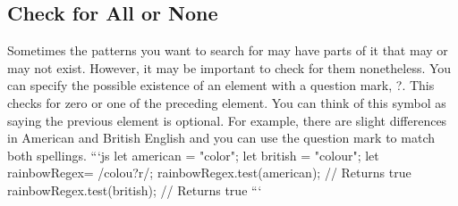 \documentclass{article}%
\begin{document}
%
\subsection{Check for All or None}%
\label{subsec:CheckforAllorNone}%
Sometimes the patterns you want to search for may have parts of it that may or may not exist. However, it may be important to check for them nonetheless.\newline%
You can specify the possible existence of an element with a question mark, ?. This checks for zero or one of the preceding element. You can think of this symbol as saying the previous element is optional.\newline%
For example, there are slight differences in American and British English and you can use the question mark to match both spellings.\newline%
```js\newline%
let american = "color";\newline%
let british = "colour";\newline%
let rainbowRegex= /colou?r/;\newline%
rainbowRegex.test(american); // Returns true\newline%
rainbowRegex.test(british); // Returns true\newline%
```\newline%

%
\end{document}
